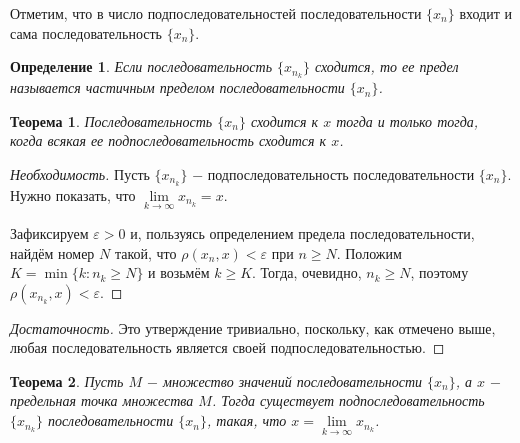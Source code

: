 \documentclass{article}
\newtheorem{theorem}{Теорема}[section]
\newtheorem{definition}{Определение}[section]
\begin{document}
Отметим, что в число подпоследовательностей последовательности \(\{x_n\}\) входит и сама последовательность \(\{x_n\}\).

\begin{definition}
Если последовательность \(\{x_{n_k}\}\) сходится, то ее предел называется частичным пределом последовательности \(\{x_n\}\).
\end{definition}

\begin{theorem}
Последовательность \(\{x_n\}\) сходится к \(x\) тогда и только тогда, когда всякая ее подпоследовательность сходится к \(x\).
\end{theorem}

\begin{proof}[Необходимость]
Пусть \(\{x_{n_k}\}\) \(-\) подпоследовательность последовательности \(\{x_n\}\). Нужно показать, что \(\lim\limits_{k \to \infty}{x_{n_k}} = x\).

Зафиксируем \(\varepsilon > 0\) и, пользуясь определением предела последовательности, найдём номер \(N\) такой, что \(\rho(x_n, x) < \varepsilon\) при \(n \geq N\). Положим \(K = \min\{k : n_k \geq N\}\) и возьмём \(k \geq K\). Тогда, очевидно, \(n_k \geq N\), поэтому \(\rho(x_{n_k}, x) < \varepsilon\).
\end{proof}

\begin{proof}[Достаточность]
Это утверждение тривиально, поскольку, как отмечено выше, любая последовательность является своей подпоследовательностью.
\end{proof}

\begin{theorem}
Пусть \(M\) \(-\) множество значений последовательности \(\{x_n\}\), а \(x\) \(-\) предельная точка множества \(M\). Тогда существует подпоследовательность \(\{x_{n_k}\}\) последовательности \(\{x_n\}\), такая, что \(x = \lim\limits_{k \to \infty} x_{n_k}\).
\end{theorem}
\end{document}
